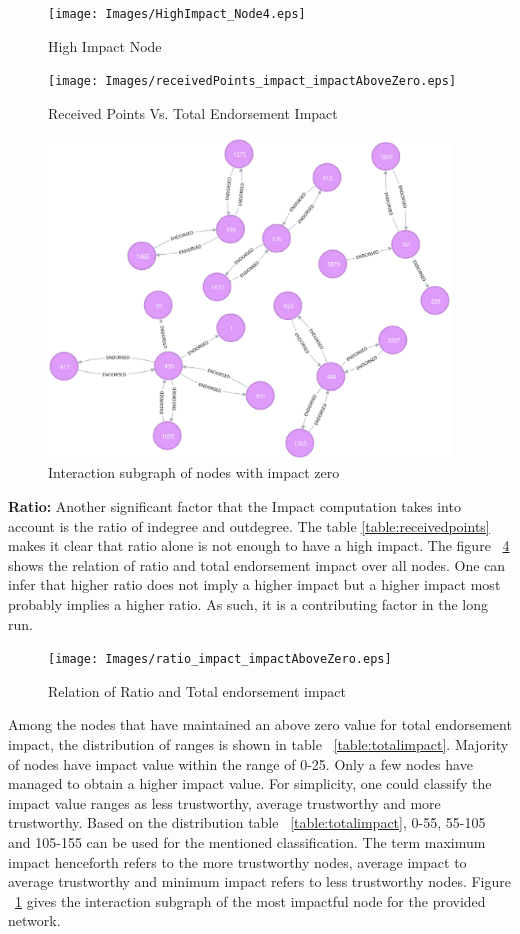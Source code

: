 \begin{figure}
	\texttt{[image: Images/HighImpact\_Node4.eps]}
	\caption{High Impact Node}
	\label{fig:highImpactNode}
\end{figure}

\begin{figure}
	\texttt{[image: Images/receivedPoints\_impact\_impactAboveZero.eps]}
	\caption{Received Points Vs. Total Endorsement Impact}
	\label{fig:receivedpointvsimpact}
\end{figure}
\begin{figure}
	\includegraphics[width=0.95\textwidth]{Images/nodesWithImpactZero.eps}
	\caption{Interaction subgraph of nodes with impact zero}
	\label{fig:zeroimpact}
\end{figure}
\textbf{Ratio:}
Another significant factor that the Impact computation takes into account is
the ratio of indegree and outdegree. The table \ref{table:receivedpoints} makes
it clear that ratio alone is not enough to have a high impact. The figure
~\ref{fig:ratioimpact} shows the relation of ratio and total endorsement impact
over all nodes. One can infer that higher ratio does not imply a higher impact
but a higher impact most probably implies a higher ratio. As such, it is a
contributing factor in the long run. 
\begin{figure}
	\texttt{[image: Images/ratio\_impact\_impactAboveZero.eps]}
	\caption{Relation of Ratio and Total endorsement impact}
	\label{fig:ratioimpact}
\end{figure}
Among the nodes that have maintained an above zero value for total endorsement
impact, the distribution of ranges is shown in table ~\ref{table:totalimpact}.
Majority of nodes have impact value within the range of 0-25. Only a few nodes
have managed to obtain a higher impact value.  For simplicity, one could
classify the impact value ranges as less trustworthy, average trustworthy and
more trustworthy. Based on the distribution table ~\ref{table:totalimpact},
0-55, 55-105 and 105-155 can be used for the mentioned classification. The term
maximum impact henceforth refers to the more trustworthy nodes, average impact
to average trustworthy and minimum impact refers to less trustworthy nodes. 
Figure ~\ref{fig:highImpactNode} gives the interaction subgraph of the most
impactful node for the provided network.


